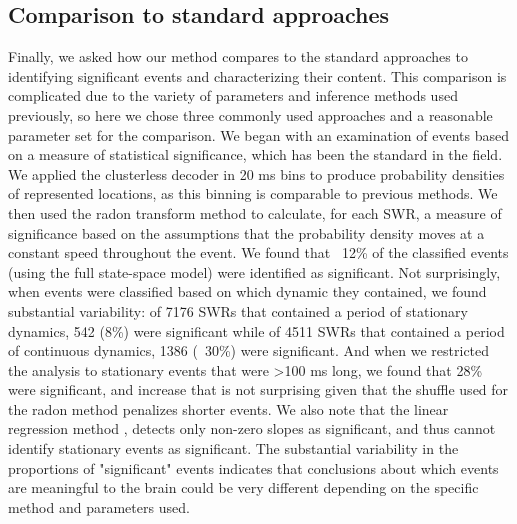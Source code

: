 \documentclass[9pt,lineno]{elife}
\begin{document}
\subsection*{Comparison to standard approaches}
Finally, we asked how our method compares to the standard approaches to identifying significant events and characterizing their content. This comparison is complicated due to the variety of parameters and inference methods used previously, so here we chose three commonly used approaches and a reasonable parameter set for the comparison. We began with an examination of events based on a measure of statistical significance, which has been the standard in the field.  We applied the clusterless decoder in 20 ms bins to produce probability densities of represented locations, as this binning is comparable to previous methods. We then used the radon transform method \citep{DavidsonHippocampalReplayExtended2009, FarooqEmergencepreconfiguredplastic2019} to calculate, for each SWR, a measure of significance based on the assumptions that the probability density moves at a constant speed throughout the event. We found that ~12\% of the classified events (using the full state-space model) were identified as significant. Not surprisingly, when events were classified based on which dynamic they contained, we found substantial variability: of 7176 SWRs that contained a period of stationary dynamics, 542 (8\%) were significant while of 4511 SWRs that contained a period of continuous dynamics, 1386 (~30\%) were significant. And when we restricted the analysis to stationary events that were >100 ms long, we found that 28\% were significant, and increase that is not surprising given that the shuffle used for the radon method penalizes shorter events. We also note that the linear regression method \citep{KarlssonAwakereplayremote2009, CarrHippocampalreplayawake2011, ShinDynamicsAwakeHippocampalPrefrontal2019}, detects only non-zero slopes as significant, and thus cannot identify stationary events as significant. The substantial variability in the proportions of "significant" events indicates that conclusions about which events are meaningful to the brain could be very different depending on the specific method and parameters used. 
\end{document}

